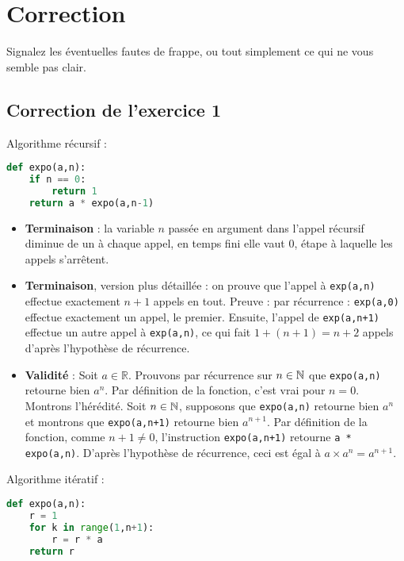 \documentclass[11pt,a4paper]{article}
\begin{document}
\section*{Correction}

Signalez les éventuelles fautes de frappe, ou tout simplement ce qui ne vous semble pas clair.


\subsection*{Correction de l'exercice 1}
Algorithme récursif : 
\begin{lstlisting}[language=Python]
def expo(a,n):
	if n == 0:
		return 1
	return a * expo(a,n-1)
\end{lstlisting}
\begin{itemize}

\item \textbf{Terminaison} : la variable $n$ passée en argument dans l'appel récursif diminue de un à chaque appel, en temps fini elle vaut $0$, étape à laquelle les appels s'arrêtent.
\item \textbf{Terminaison}, version plus détaillée : on prouve que l'appel à \verb+exp(a,n)+ effectue exactement $n+1$ appels en tout. Preuve : par récurrence : \verb+exp(a,0)+ effectue exactement un appel, le premier.  Ensuite, l'appel de \verb|exp(a,n+1)| effectue un autre appel à \verb+exp(a,n)+, ce qui fait $1+(n+1) = n+2$ appels d'après l'hypothèse de récurrence.
\item \textbf{Validité} : Soit $a \in \mathbb R$. Prouvons par récurrence sur $n \in \mathbb{N}$ que \verb+expo(a,n)+ retourne bien $a^n$. Par définition de la fonction, c'est vrai pour $n=0$. Montrons l'hérédité. Soit $n\in\mathbb{N}$, supposons que \verb+expo(a,n)+ retourne bien $a^n$ et montrons que  \verb|expo(a,n+1)| retourne bien $a^{n+1}$. Par définition de la fonction, comme $n+1 \neq 0$, l'instruction \verb|expo(a,n+1)|  retourne \verb+a * expo(a,n)+. D'après l'hypothèse de récurrence,  ceci est égal à  $a\times a^n = a^{n+1}$.
\end{itemize}
Algorithme itératif :

\begin{lstlisting}[language=Python]
def expo(a,n):
	r = 1
	for k in range(1,n+1):
		r = r * a
	return r
\end{lstlisting}
\end{document}
